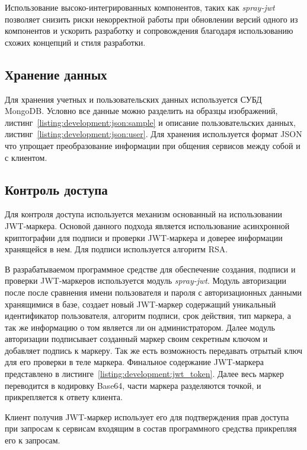 Использование высоко-интегрированных компонентов, таких как \emph{spray-jwt} позволяет снизить риски некорректной работы при обновлении версий одного из компонентов и ускорить разработку и сопровождения благодаря использованию схожих концепций и стиля разработки.

\subsection{Хранение данных}
Для хранения учетных и пользовательских данных используется СУБД MongoDB. Условно все данные можно разделить на образцы изображений, листинг~\ref{listing:development:json:sample} и описание пользовательских данных, листинг~\ref{listing:development:json:user}. Для хранения используется формат JSON что упрощает преобразование информации при общения сервисов между собой и с клиентом. 





\subsection{Контроль доступа}
\label{sec:development:access_control}
Для контроля доступа используется механизм основанный на использовании JWT-маркера. Основой данного подхода является использование асинхронной криптографии для подписи и проверки JWT-маркера и доверее информации хранящейся в нем. Для подписи используется алгоритм RSA.

В разрабатываемом программное средстве для обеспечение создания, подписи и проверки JWT-маркеров используется модуль \emph{spray-jwt}. Модуль авторизации после после сравнения имени пользователя и пароля с авторизационных данными хранящимися в базе, создает новый JWT-маркер содержащий уникальный идентификатор пользователя, алгоритм подписи, срок действия, тип маркера, а так же информацию о том является ли он администратором. Далее модуль авторизации подписывает созданный маркер своим секретным ключом и добавляет подпись к маркеру. Так же есть возможность передавать отрытый ключ для его проверки в теле маркера.
Финальное содержание JWT-маркера представлено в листинге~\ref{listing:development:jwt_token}. Далее весь маркер переводится в кодировку Base64, части маркера разделяются точкой, и прикрепляется к ответу клиента.

Клиент получив JWT-маркер использует его для подтверждения прав доступа при запросам к сервисам входящим в состав программного средства прикрепляя его к запросам.

